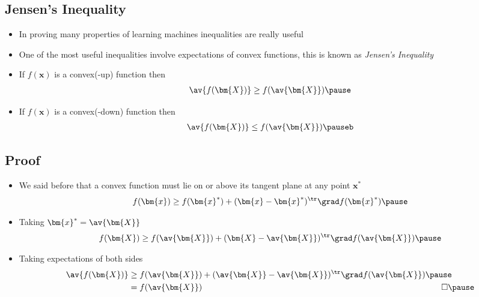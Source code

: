 \begin{slide}
\section{Jensen's Inequality}

\begin{PauseHighLight}
  \begin{itemize}
  \item In proving many properties of learning machines inequalities
    are really useful\pause
  \item One of the most useful inequalities involve expectations of
    convex functions, this is known as \emph{Jensen's
      Inequality}\pause
  \item If $f(\bm{x})$ is a convex(-up) function then
    \begin{align*}
      \av{f(\bm{X})} \geq f(\av{\bm{X}})\pause
    \end{align*}
  \item If $f(\bm{x})$ is a convex(-down) function then
    \begin{align*}
      \av{f(\bm{X})} \leq f(\av{\bm{X}})\pauseb
    \end{align*}
  \end{itemize}
\end{PauseHighLight}

\end{slide}


\begin{slide}
\section{Proof}

\begin{PauseHighLight}
  \begin{itemize}
  \item We said before that a convex function must lie on or above its
    tangent plane at any point $\bm{x}^*$
    \begin{align*}
      f(\bm{x}) \geq f(\bm{x}^*) + (\bm{x}-\bm{x}^*)^\tr \grad f(\bm{x}^*)\pause
    \end{align*}
  \item Taking $\bm{x}^*=\av{\bm{X}}$
    \begin{align*}
      f(\bm{X}) \geq f(\av{\bm{X}}) + (\bm{X}-\av{\bm{X}})^\tr \grad f(\av{\bm{X}})\pause
    \end{align*}
  \item Taking expectations of both sides
    \begin{align*}
      \av{f(\bm{X})}
      &\geq f(\av{\bm{X}}) +
      (\av{\bm{X}}-\av{\bm{X}})^\tr \grad f(\av{\bm{X}})\pause\\
      &= f(\av{\bm{X}}) \hspace{10cm} \square\pause
    \end{align*}
  \end{itemize}
\end{PauseHighLight}

\end{slide}

